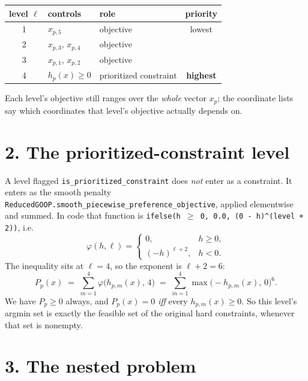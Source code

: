 \documentclass[11pt]{article}
\begin{document}
\begin{center}
\begin{tabular}{cllc}
  \toprule
  level \(\ell\) & controls & role & priority \\
  \midrule
  1 & \(x_{p,5}\)            & objective              & lowest \\
  2 & \(x_{p,3},\,x_{p,4}\)  & objective              & \\
  3 & \(x_{p,1},\,x_{p,2}\)  & objective              & \\
  4 & \(h_p(x) \ge 0\)       & prioritized constraint & \textbf{highest} \\
  \bottomrule
\end{tabular}
\end{center}

Each level's objective still ranges over the \emph{whole} vector \(x_p\); the coordinate lists
say which coordinates that level's objective actually depends on.

\section*{2. The prioritized-constraint level}

A level flagged \texttt{is\_prioritized\_constraint} does \emph{not} enter as a constraint. It
enters as the smooth penalty \texttt{ReducedGOOP.smooth\_piecewise\_preference\_objective},
applied elementwise and summed. In code that function is
\texttt{ifelse(h \(\ge\) 0, 0.0, (0 - h)\^{}(level + 2))}, i.e.
\[
  \varphi(h,\ell) =
  \begin{cases}
    0, & h \ge 0,\\
    (-h)^{\ell+2}, & h < 0.
  \end{cases}
\]
The inequality sits at \(\ell = 4\), so the exponent is \(\ell + 2 = 6\):
\[
  P_p(x) \;=\; \sum_{m=1}^{4} \varphi\bigl(h_{p,m}(x),\,4\bigr)
  \;=\; \sum_{m=1}^{4} \max\bigl(-h_{p,m}(x),\,0\bigr)^{6}.
\]
We have \(P_p \ge 0\) always, and \(P_p(x) = 0\) \emph{iff} every \(h_{p,m}(x) \ge 0\). So this
level's argmin set is exactly the feasible set of the original hard constraints, whenever that
set is nonempty.

\section*{3. The nested problem}
\end{document}
